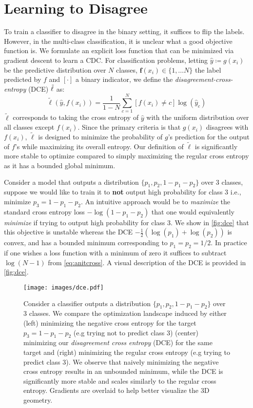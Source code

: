 \section{Learning to Disagree}\label{sec:dis}
To train a classifier to disagree in the binary setting, it suffices to flip the labels.
However, in the multi-class classification, it is unclear what a good objective function is.
We formulate an explicit loss function that can be minimized via gradient descent to learn a CDC.
For classification problems, letting $\hat{y} \coloneqq g(x_i)$ be the predictive distribution over $N$ classes, $\mathbf{f}(x_i)\in \{1,\dots N\}$
the label predicted by $f$ and $[\cdot ]$ a binary indicator, we define the \textit{disagreement-cross-entropy} (DCE) $\small \tilde{\ell}$ as:
\begin{equation}
    \tilde{\ell}(\hat{y}, f(x_i)) =  \frac{1}{1-N} \sum_{c=1}^N [{f(x_i) \neq c}] \log(\hat{y}_c)
    \label{eq:anitcross}
\end{equation}
$\tilde{\ell}$ corresponds to taking the cross entropy of $\hat{y}$ with the uniform distribution over all classes except $f(x_i)$.
Since the primary criteria is that $g(x_i)$ disagrees with $f(x_i)$, $\tilde{\ell}$ is designed to minimize the probability of $g$'s prediction for the output of $f$'s while maximizing its overall entropy.
Our definition of $\tilde{\ell}$ is significantly more stable to optimize compared to simply maximizing the regular cross entropy as it has a bounded global minimum.

Consider a model that outputs a distribution $\{p_1, p_2, 1-p_1-p_2\}$ over $3$ classes, suppose we would like to train it to \textbf{not} output high probability for class $3$ i.e., minimize $p_3=1-p_1-p_2$.
An intuitive approach would be to \textit{maximize} the standard cross entropy loss $-\log(1-p_1-p_2)$ that one would equivalently \textit{minimize} if trying to output high probability for class $3$.
We show in \autoref{fig:dce} that this objective is unstable whereas the DCE $-\frac{1}{2}(\log(p_1) + \log(p_2))$ is convex, and has a bounded minimum corresponding to $p_1=p_2=1/2$.
In practice if one wishes a loss function with a minimum of zero it suffices to subtract $ \log(N-1)$ from \autoref{eq:anitcross}.
A visual description of the DCE is provided in \autoref{fig:dce}.
\begin{figure}[!htb]
    \centering
    \texttt{[image: images/dce.pdf]}
    \caption{Consider a classifier outputs a distribution $\{p_1, p_2, 1-p_1-p_2\}$ over $3$ classes. We compare the optimization landscape induced by either (left) minimizing the negative cross entropy for the target $p_3=1-p_1-p_2$ (e.g trying not to predict class $3$) (center) minimizing our \textit{disagreement cross entropy} (DCE) for the same target
    and (right) minimizing the regular cross entropy (e.g trying to predict class $3$). We observe that naively minimizing the negative cross entropy results in an unbounded minimum, while the DCE is significantly more stable and scales similarly to the regular cross entropy. Gradients are overlaid to help better visualize the 3D geometry.}
    \label{fig:dce}
\end{figure}

